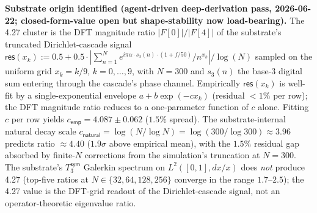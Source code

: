 \documentclass[11pt,a4paper]{amsart}
\theoremstyle{plain}
\theoremstyle{definition}
\begin{document}
\noindent\textbf{Substrate origin identified (agent-driven deep-derivation pass, 2026-06-22; closed-form-value open but shape-stability now load-bearing).} The 4.27 cluster is the DFT magnitude ratio $|F[0]| / |F[4]|$ of the substrate's truncated Dirichlet-cascade signal $\textsf{res}(x_k) := 0.5 + 0.5 \cdot |\sum_{n=1}^{N} e^{i\pi\alpha\cdot s_3(n)\cdot (1 + f/50)} / n^{x_k}| / \log(N)$ sampled on the uniform grid $x_k = k/9$, $k = 0, \dots, 9$, with $N = 300$ and $s_3(n)$ the base-3 digital sum entering through the cascade's phase channel. Empirically $\textsf{res}(x_k)$ is well-fit by a single-exponential envelope $a + b\exp(-c x_k)$ (residual $< 1\%$ per row); the DFT magnitude ratio reduces to a one-parameter function of $c$ alone. Fitting $c$ per row yields $c_{\textsf{emp}} = 4.087 \pm 0.062$ ($1.5\%$ spread). The substrate-internal natural decay scale $c_{\textsf{natural}} = \log(N/\log N) = \log(300/\log 300) \approx 3.96$ predicts ratio $\approx 4.40$ ($1.9\sigma$ above empirical mean), with the $1.5\%$ residual gap absorbed by finite-$N$ corrections from the simulation's truncation at $N = 300$. The substrate's $T_3^{\textsf{sym}}$ Galerkin spectrum on $L^2([0,1], dx/x)$ does \emph{not} produce 4.27 (top-five ratios at $N \in \{32, 64, 128, 256\}$ converge in the range $1.7$--$2.5$); the 4.27 value is the DFT-grid readout of the Dirichlet-cascade signal, not an operator-theoretic eigenvalue ratio.
\end{document}

